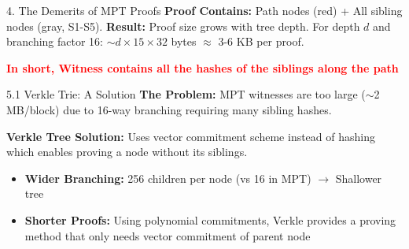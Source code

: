 \documentclass{beamer}
\begin{document}
\begin{frame}{4. The Demerits of MPT Proofs}
    \vspace{0.3cm}
    \textbf{Proof Contains:} Path nodes (red) + All sibling nodes (gray, S1-S5). \textbf{Result:} Proof size grows with tree depth. For depth $d$ and branching factor 16: $\sim d \times 15 \times 32$ bytes $\approx$ 3-6 KB per proof.
    \pause
    \begin{center}
    \textcolor{red}{\textbf{In short, Witness contains all the hashes of the siblings along the path}}
    \end{center}
\end{frame}



\begin{frame}{5.1 Verkle Trie: A Solution}
    \textbf{The Problem:} MPT witnesses are too large ($\sim$2 MB/block) due to 16-way branching requiring many sibling hashes.
    
    \vspace{0.3cm}
    \textbf{Verkle Tree Solution:} Uses vector commitment scheme instead of hashing which enables proving a node without its siblings.
    
    \begin{itemize}
        \item \textbf{Wider Branching:} 256 children per node (vs 16 in MPT) $\rightarrow$ Shallower tree
        \item \textbf{Shorter Proofs:} Using polynomial commitments, Verkle provides a proving method that only needs vector commitment of parent node
    \end{itemize}
\end{frame}
\end{document}
